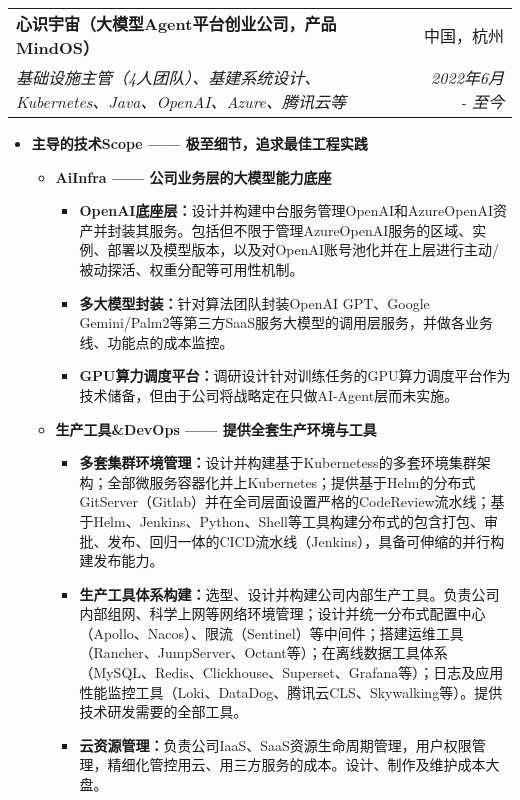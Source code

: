 \documentclass[letterpaper,11pt]{article}
\makeatletter
\newcommand{\resumeSubheading}[4]{
	\vspace{-1pt}\item
	\begin{tabular*}{0.97\textwidth}[t]{l@{\extracolsep{\fill}}r}
		\textbf{#1} & #2 \\
		\textit{\small#3} & \textit{\small #4} \\
	\end{tabular*}\vspace{-5pt}
}
\makeatother
\begin{document}
\begin{spacing}{1.0}
		\resumeSubheading
		{心识宇宙（大模型Agent平台创业公司，产品MindOS）}{中国，杭州}
		{基础设施主管（4人团队）、基建系统设计、Kubernetes、Java、OpenAI、Azure、腾讯云等}{2022年6月 - 至今}
		\begin{itemize}
			\item \textbf{主导的技术Scope —— 极至细节，追求最佳工程实践}
			\begin{itemize}
				\item \textbf{AiInfra —— 公司业务层的大模型能力底座}
				\begin{itemize}
					\item \textbf{OpenAI底座层：}设计并构建中台服务管理OpenAI和AzureOpenAI资产并封装其服务。包括但不限于管理AzureOpenAI服务的区域、实例、部署以及模型版本，以及对OpenAI账号池化并在上层进行主动/被动探活、权重分配等可用性机制。
					\item \textbf{多大模型封装：}针对算法团队封装OpenAI GPT、Google Gemini/Palm2等第三方SaaS服务大模型的调用层服务，并做各业务线、功能点的成本监控。
					\item \textbf{GPU算力调度平台：}调研设计针对训练任务的GPU算力调度平台作为技术储备，但由于公司将战略定在只做AI-Agent层而未实施。
				\end{itemize}
				
				\item \textbf{生产工具\&DevOps —— 提供全套生产环境与工具}
				\begin{itemize}
					\item \textbf{多套集群环境管理：}设计并构建基于Kubernetess的多套环境集群架构；全部微服务容器化并上Kubernetes；提供基于Helm的分布式GitServer（Gitlab）并在全司层面设置严格的CodeReview流水线；基于Helm、Jenkins、Python、Shell等工具构建分布式的包含打包、审批、发布、回归一体的CICD流水线（Jenkins），具备可伸缩的并行构建发布能力。
					\item \textbf{生产工具体系构建：}选型、设计并构建公司内部生产工具。负责公司内部组网、科学上网等网络环境管理；设计并统一分布式配置中心（Apollo、Nacos）、限流（Sentinel）等中间件；搭建运维工具（Rancher、JumpServer、Octant等）；在离线数据工具体系（MySQL、Redis、Clickhouse、Superset、Grafana等）；日志及应用性能监控工具（Loki、DataDog、腾讯云CLS、Skywalking等）。提供技术研发需要的全部工具。
					\item \textbf{云资源管理：}负责公司IaaS、SaaS资源生命周期管理，用户权限管理，精细化管控用云、用三方服务的成本。设计、制作及维护成本大盘。
				\end{itemize}
				

\end{itemize}
\end{itemize}
\end{spacing}
\end{document}
